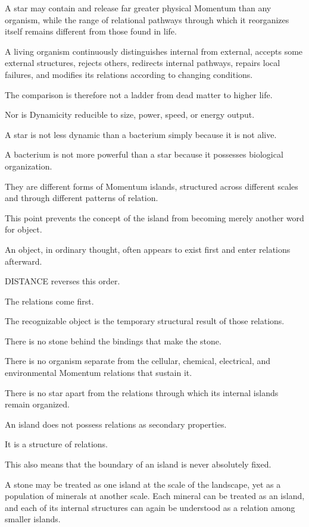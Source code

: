 A star may contain and release far greater physical Momentum than any organism, while the range of relational pathways through which it reorganizes itself remains different from those found in life.

A living organism continuously distinguishes internal from external, accepts some external structures, rejects others, redirects internal pathways, repairs local failures, and modifies its relations according to changing conditions.

The comparison is therefore not a ladder from dead matter to higher life.

Nor is Dynamicity reducible to size, power, speed, or energy output.

A star is not less dynamic than a bacterium simply because it is not alive.

A bacterium is not more powerful than a star because it possesses biological organization.

They are different forms of Momentum islands, structured across different scales and through different patterns of relation.

This point prevents the concept of the island from becoming merely another word for object.

An object, in ordinary thought, often appears to exist first and enter relations afterward.

DISTANCE reverses this order.

The relations come first.

The recognizable object is the temporary structural result of those relations.

There is no stone behind the bindings that make the stone.

There is no organism separate from the cellular, chemical, electrical, and environmental Momentum relations that sustain it.

There is no star apart from the relations through which its internal islands remain organized.

An island does not possess relations as secondary properties.

It is a structure of relations.

This also means that the boundary of an island is never absolutely fixed.

A stone may be treated as one island at the scale of the landscape, yet as a population of minerals at another scale. Each mineral can be treated as an island, and each of its internal structures can again be understood as a relation among smaller islands.


